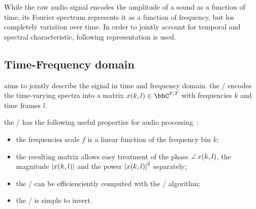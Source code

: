 
%
%


While the raw audio signal encodes the amplitude of a sound as a function of time,
its Fourier spectrum represents it as a function of frequency, but los completely variation over time.
In order to jointly account for temporal and spectral characteristic, following representation is used.

\subsection{Time-Frequency domain}
 aims to jointly describe the signal in time and frequency domain.
the \STFTdef/ encodes the time-varying spectra into a matrix $x(k,l) \in \bbC^{F,T}$ with frequencies $k$ and time frames $l$.

the \STFT/ has the following useful properties for audio processing~\cite{vincent2018audio}:
\begin{itemize}
    \item the frequencies scale $f$ is a linear function of the frequency bin $k$;
    \item the resulting matrix allows easy treatment of
          the phase $\operatorname*{\angle}{x(k,l)}$, the magnitude $\magnitudeOf{x(k,l)}$ and the power $\powerOf{x(k,l)}$ separately;
    \item the \DFT/ can be efficienciently computed with the \FFT/ algorithm;
    \item the \STFT/ is simple to invert.
\end{itemize}

